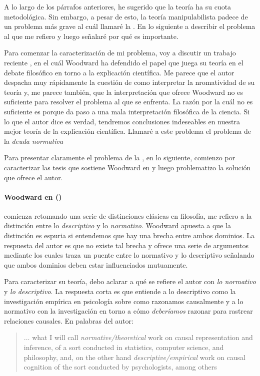 A lo largo de los párrafos anteriores, he sugerido que la
teoría ha  su cuota metodológica. 
Sin embargo, a pesar de esto, la teoría 
manipulabilista padece de un problema más grave al cuál 
llamaré la . En lo
siguiente a describir el problema al que me refiero y luego
señalaré por qué es importante. 

Para comenzar la caracterización de mi problema, voy a
discutir un trabajo reciente , en el
cuál Woodward ha defendido el papel que juega su teoría en
el debate filosófico en torno a la explicación científica.
Me parece que el autor despacha muy rápidamente la cuestión
de como interpretar la nromatividad de su teoría y, me
parece también, que la interpretación que ofrece Woodward no
es suficiente para resolver el problema al que se enfrenta.
La razón por la cuál no es suficiente es porque da paso a
una mala interpretación filosófica de la ciencia. Si lo que
el autor dice es verdad, tendremos conclusiones indeseables
en nuestra mejor teoría de la explicación científica.
Llamaré a este problema el problema de la \emph{deuda
normativa}  

Para presentar claramente el problema de la , en lo siguiente, comienzo por caracterizar las
tesis que sostiene Woodward en  y luego
problematizo la solución que ofrece el autor. 

\paragraph{Woodward en (\citeyear{caushuman})} comienza
retomando una serie de distinciones clásicas en filosofía,
me refiero a la distinción entre lo \emph{descriptivo} y lo
\emph{normativo}. Woodward apuesta a que la distinción es
espuria si entendemos que hay una brecha entre ambos
dominios. La respuesta del autor es que no existe
tal brecha y ofrece una serie de argumentos mediante los
cuales traza un puente entre lo normativo y lo descriptivo
señalando que ambos dominios deben estar influenciados
mutuamente.

Para caracterizar su teoría, debo aclarar a qué se refiere
el autor con \emph{lo normativo} y \emph{lo descriptivo}. La
respuesta corta es que entiende a lo descriptivo como la
investigación empírica en psicología sobre como razonamos
causalmente y a lo normativo con la investigación en torno a
cómo \emph{deberíamos} razonar para rastrear relaciones
causales. En palabras del autor:

\begin{quote} 
  $\ldots$ what I will call \emph{normative/theoretical}
  work on causal representation and inference, of a sort
  conducted in statistics, computer science, and philosophy,
  and, on the other hand \emph{descriptive/empirical} work
  on causal cognition of the sort conducted by
  psychologists, among others
\end{quote}

